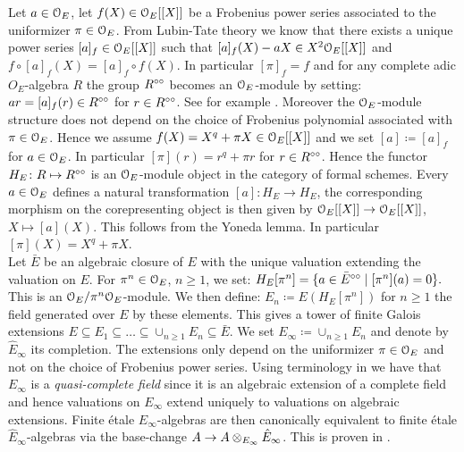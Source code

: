 Let $a\in\mathcal{O}_E$, let  $f(X)\in\mathcal{O}_E[[X]]$ be a Frobenius power series associated to the uniformizer $\pi\in\mathcal{O}_E$.
From Lubin-Tate theory we know that there exists a unique power series $[a]_f\in\mathcal{O}_E[[X]]$ such that $[a]_f(X)-aX\in  X^2\mathcal{O}_E[[X]]$ and $f\circ[a]_f(X) = [a]_f\circ f(X)$.
In particular $[\pi]_f=f$ and for any complete adic $O_E$-algebra $R$ the group $R^{\circ\circ}$ becomes an $\mathcal{O}_E$-module by setting:
$ar = [a]_f(r)\in R^{\circ\circ}$ for $r\in R^{\circ\circ}$. See for example \cite[section 32.1.3]{Hazewinkel78}.
Moreover the $\mathcal{O}_E$-module structure does not depend on the choice of Frobenius polynomial associated with $\pi\in\mathcal{O}_E$.
Hence we assume $f(X)=X^q + \pi X\in\mathcal{O}_E[[X]]$ and we set $[a]\coloneqq [a]_f$ for $a\in\mathcal{O}_E$. In particular 
$[\pi](r)=r^q + \pi r$ for $r\in R^{\circ\circ}$.
Hence the functor $H_E\colon R\mapsto R^{\circ\circ}$ is an $\mathcal{O}_E$-module object in the category of formal schemes.
Every $a\in\mathcal{O}_E$ defines a natural transformation $[a]\colon H_E\to H_E$, the corresponding morphism on the corepresenting object is then given by $\mathcal{O}_E[[X]]\to\mathcal{O}_E[[X]]$, $X\mapsto[a](X)$. This follows from the Yoneda lemma.
In particular $[\pi](X)=X^q + \pi X$.\\

Let $\bar{E}$ be an algebraic closure of $E$ with the unique valuation extending the valuation on $E$. For $\pi^n\in\mathcal{O}_E$, $n\geq1$, we set:
$H_E[\pi^n] = \{a\in\bar{E}^{\circ\circ}\mid [\pi^n](a)=0\}.$
This is an $\mathcal{O}_E/\pi^n\mathcal{O}_E$-module. We then define:
$E_n\coloneqq E(H_E[\pi^n])$ for $n\geq1$ the field generated over $E$ by these elements. This gives a tower of finite Galois extensions $E\subseteq E_1\subseteq\dots\subseteq\cup_{n\geq1}E_n\subseteq\bar{E}$.
We set $E_{\infty}\coloneqq\cup_{n\geq1}E_n$ and denote by $\hat{E}_{\infty}$ its completion.
The extensions only depend on the uniformizer $\pi\in\mathcal{O}_E$ and not on the choice of Frobenius power series.
Using terminology in \cite{Berkovich93} we have that $E_{\infty}$ is a \emph{quasi-complete field} since it is an algebraic extension of a complete field and hence valuations on $E_{\infty}$ extend uniquely to valuations on algebraic extensions.
Finite \'{e}tale $E_{\infty}$-algebras are then canonically equivalent to finite \'{e}tale $\hat{E}_{\infty}$-algebras via the base-change $A\to A\mathbin{\otimes}_{E_{\infty}}\hat{E}_{\infty}$.
This is proven in  \cite[proposition 2.4.1]{Berkovich93}.\\

